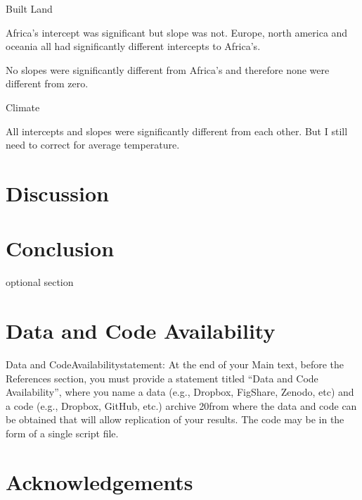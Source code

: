 \documentclass[11pt, a4paper, titlepage]{article}
\begin{document}
Built Land \newline

Africa's intercept was significant but slope was not. Europe, north america and oceania all had significantly different intercepts to Africa's.

No slopes were significantly different from Africa's and therefore none were different from zero. \newline

Climate \newline

All intercepts and slopes were significantly different from each other. But I still need to correct for average temperature.
 
	 
	 
	 

    \clearpage
    
     \section*{Discussion}
     
     \clearpage
     
     \section*{Conclusion }
     optional section
     \clearpage
    
    \section*{Data and Code Availability}
    Data  and  CodeAvailabilitystatement:  At  the  end  of  your  Main  text,  before  the  References section, you must provide a statement titled “Data and Code Availability”, where you name a data (e.g., Dropbox, FigShare, Zenodo, etc) and a code (e.g., Dropbox, GitHub, etc.) archive 
    20from where the data and code can be obtained that will allow replication of your results. The code may be in the form of a single script file.
    
    \clearpage
    \section*{Acknowledgements}
    

    
\end{document}
